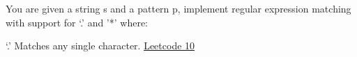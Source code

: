 \documentclass[
  letterpaper,
  DIV=11,
  numbers=noendperiod]{scrartcl}
\newenvironment{Shaded}{\begin{snugshade}}{\end{snugshade}}
\begin{document}
You are given a string s and a pattern p, implement regular expression
matching with support for `.' and '*' where:

`.' Matches any single character.
\href{https://leetcode.com/problems/regular-expression-matching/}{Leetcode
10}

\begin{Shaded}
\begin{Highlighting}[]

\end{Highlighting}
\end{Shaded}
\end{document}
